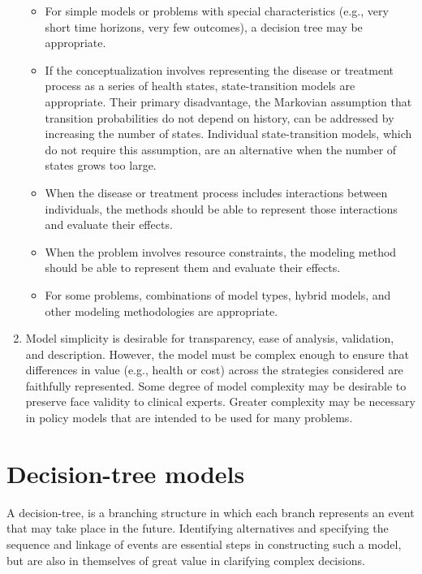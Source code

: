\documentclass[
]{book}
\providecommand{\tightlist}{%
  \setlength{\itemsep}{0pt}\setlength{\parskip}{0pt}}
\begin{document}
\begin{enumerate}
  \begin{itemize}
  \tightlist
  \item
    For simple models or problems with special characteristics (e.g., very short time horizons, very few outcomes), a decision tree may be appropriate.
  \item
    If the conceptualization involves representing the disease or treatment process as a series of health states, state-transition models are appropriate. Their primary disadvantage, the Markovian assumption that transition probabilities do not depend on history, can be addressed by increasing the number of states. Individual state-transition models, which do not require this assumption, are an alternative when the number of states grows too large.
  \item
    When the disease or treatment process includes interactions between individuals, the methods should be able to represent those interactions and evaluate their effects.
  \item
    When the problem involves resource constraints, the modeling method should be able to represent them and evaluate their effects.
  \item
    For some problems, combinations of model types, hybrid models, and other modeling methodologies are appropriate.
  \end{itemize}
\item
  Model simplicity is desirable for transparency, ease of analysis, validation, and description. However, the model must be complex enough to ensure that differences in value (e.g., health or cost) across the strategies considered are faithfully represented. Some degree of model complexity may be desirable to preserve face validity to clinical experts. Greater complexity may be necessary in policy models that are intended to be used for many problems.
\end{enumerate}

\hypertarget{decision-tree-models}{%
\section{Decision-tree models}\label{decision-tree-models}}

A decision-tree, is a branching structure in which each branch represents an event that may take place in the future. Identifying alternatives and specifying the sequence and linkage of events are essential steps in constructing such a model, but are also in themselves of great value in clarifying complex decisions.
\end{document}
